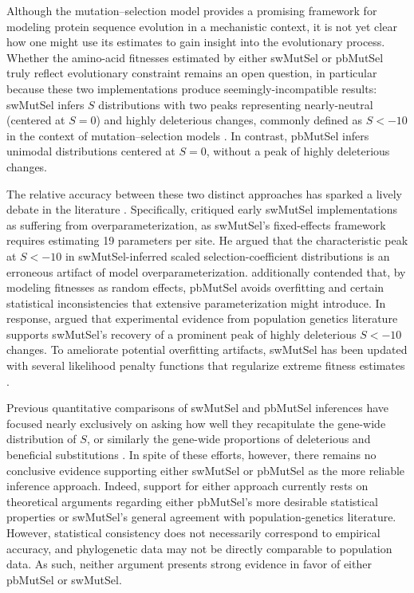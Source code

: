 \documentclass[11pt]{article}
\begin{document}
Although the mutation--selection model provides a promising framework for modeling protein sequence evolution in a mechanistic context, it is not yet clear how one might use its estimates to gain insight into the evolutionary process. Whether the amino-acid fitnesses estimated by either swMutSel or pbMutSel truly reflect evolutionary constraint remains an open question, in particular because these two implementations produce seemingly-incompatible results: swMutSel infers $S$ distributions with two peaks representing nearly-neutral (centered at $S=0$) and highly deleterious changes, commonly defined as $S<-10$ in the context of mutation--selection models \citep{Tamurietal2012,Rodrigue2013,Tamurietal2014}. In contrast, pbMutSel infers unimodal distributions centered at $S=0$, without a peak of highly deleterious changes.

The relative accuracy between these two distinct approaches has sparked a lively debate in the literature \citep{Rodrigue2013,Tamurietal2014,RodrigueLartillot2014,Scheffleretal2014}. Specifically, \citet{Rodrigue2013} critiqued early swMutSel implementations as suffering from overparameterization, as swMutSel's fixed-effects framework requires estimating 19 parameters per site. He argued that the characteristic peak at $S<-10$ in swMutSel-inferred scaled selection-coefficient distributions is an erroneous artifact of model overparameterization. \citet{Rodrigue2013} additionally contended that, by modeling fitnesses as random effects, pbMutSel avoids overfitting and certain statistical inconsistencies that extensive parameterization might introduce. In response, \citet{Tamurietal2014} argued that experimental evidence from population genetics literature supports swMutSel's recovery of a prominent peak of highly deleterious $S<-10$ changes. To ameliorate potential overfitting artifacts, swMutSel has been updated with several likelihood penalty functions that regularize extreme fitness estimates \citep{Tamurietal2014}.

Previous quantitative comparisons of swMutSel and pbMutSel inferences have focused nearly exclusively on asking how well they recapitulate the gene-wide distribution of $S$, or similarly the gene-wide proportions of deleterious and beneficial substitutions \citep{Rodrigueetal2010,Tamurietal2012,Rodrigue2013,Tamurietal2014,RodrigueLartillot2014}. In spite of these efforts, however, there remains no conclusive evidence supporting either swMutSel or pbMutSel as the more reliable inference approach. Indeed, support for either approach currently rests on theoretical arguments regarding either pbMutSel's more desirable statistical properties or swMutSel's general agreement with population-genetics literature. However, statistical consistency does not necessarily correspond to empirical accuracy, and phylogenetic data may not be directly comparable to population data. As such, neither argument presents strong evidence in favor of either pbMutSel or swMutSel.
\end{document}
